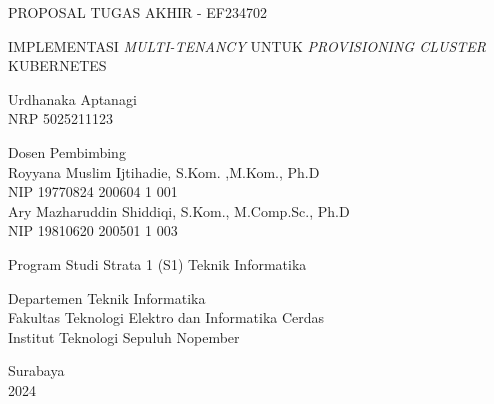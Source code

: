 \begin{large}
  PROPOSAL TUGAS AKHIR - EF234702
\end{large}

\vspace{\fill}

\begin{spacing}{1.5}
  \begin{Large}
    IMPLEMENTASI \emph{MULTI-TENANCY} UNTUK
    \emph{PROVISIONING CLUSTER} KUBERNETES 
  \end{Large}
\end{spacing}

\vspace{\fill}

\begin{large}
  Urdhanaka Aptanagi \\
  \textmd{NRP 5025211123}
\end{large}

\vspace{\fill}

\begin{large}
  \textmd{Dosen Pembimbing} \\
  Royyana Muslim Ijtihadie, S.Kom. ,M.Kom., Ph.D \\
  \textmd{NIP 19770824 200604 1 001} \\
  Ary Mazharuddin Shiddiqi, S.Kom., M.Comp.Sc., Ph.D \\
  \textmd{NIP 19810620 200501 1 003}
\end{large}

\vspace{\fill}

Program Studi Strata 1 (S1) Teknik Informatika \\

\mdseries

Departemen Teknik Informatika \\
Fakultas Teknologi Elektro dan Informatika Cerdas \\
Institut Teknologi Sepuluh Nopember

Surabaya \\
2024
